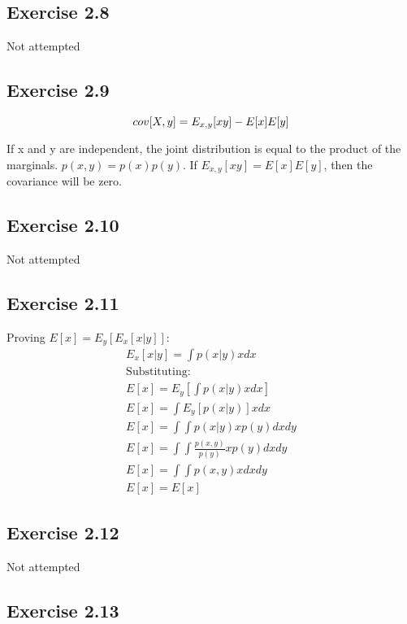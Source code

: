 \subsection{Exercise 2.8}
Not attempted

\subsection{Exercise 2.9}

\begin{equation}
  cov[X,y] = E_{x,y}[xy] - E[x]E[y] \\
\end{equation}

If x and y are independent, the joint distribution is equal to the product of the marginals. $p(x,y) = p(x)p(y)$. If $E_{x,y}[xy] = E[x]E[y]$, then the covariance will be zero.

\subsection{Exercise 2.10}
Not attempted

\subsection{Exercise 2.11}
Proving $E[x] = E_y[E_x[x|y]]$:
\begin{gather}
  E_x[x|y] = \int p(x|y)xdx \\
  \text{Substituting:} \\
  E[x] = E_y[\int p(x|y)xdx] \\
  E[x] = \int E_y[p(x|y)]xdx \\
  E[x] = \int \int p(x|y)xp(y) dxdy \\
  E[x] = \int \int \frac{p(x,y)}{p(y)}xp(y) dxdy \\
  E[x] = \int \int p(x,y)x dxdy \\
  E[x] = E[x]
\end{gather}


\subsection{Exercise 2.12}
Not attempted

\subsection{Exercise 2.13}
